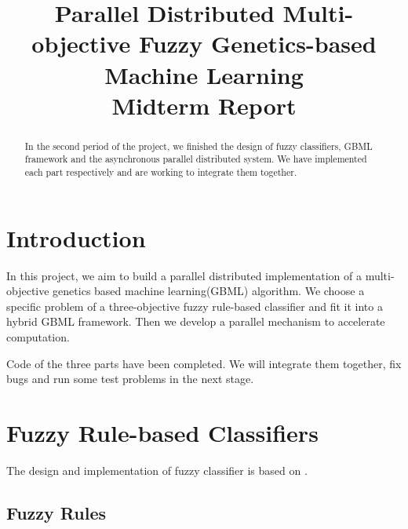 \documentclass[conference]{IEEEtran}
\begin{document}
  
  \title{Parallel Distributed Multi-objective Fuzzy Genetics-based Machine Learning \\ Midterm Report}
  
  \author{
  }
  
  \maketitle
  
  \begin{abstract}
  In the second period of the project, we finished the design of fuzzy classifiers, GBML framework and the asynchronous parallel distributed system. We have implemented each part respectively and are working to integrate them together.
  \end{abstract}
  \IEEEpeerreviewmaketitle
  
  \section{Introduction}
  In this project, we aim to build a parallel distributed implementation of a multi-objective genetics based machine learning(GBML) algorithm. We choose a specific problem of a three-objective fuzzy rule-based classifier and fit it into a hybrid GBML framework. Then we develop a parallel mechanism to accelerate computation.

  Code of the three parts have been completed. We will integrate them together, fix bugs and run some test problems in the next stage.

  \section{Fuzzy Rule-based Classifiers}
  The design and implementation of fuzzy classifier is based on \cite{ishibuchi2007analysis}.
  \subsection{Fuzzy Rules}
\end{document}
